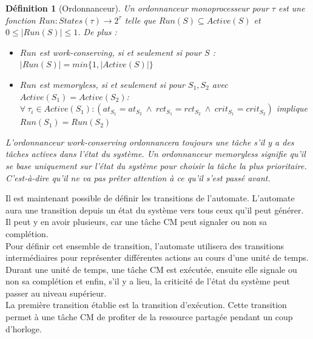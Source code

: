 \documentclass[12pt,a4paper,oneside]{book}
\theoremstyle{break}
\newtheorem{defin}{Définition}[chapter]
\theoremstyle{breakplain}
\begin{document}
\begin{defin}[Ordonnanceur]
Un \textit{ordonnanceur} monoprocesseur pour $\tau$ est une fonction $Run : States(\tau) \rightarrow 2^\tau$ telle que $Run(S) \subseteq Active(S)$ et $0 \leq |Run(S)| \leq 1$.
De plus :

\begin{itemize}
\item $Run$ est \textit{work-conserving}, si et seulement si pour $S$ : $ |Run(S)| = min\{1, |Active(S)|\}$
\item $Run$ est \textit{memoryless}, si et seulement si pour $S_1,S_2$ avec $Active(S_1) = Active(S_2)$:
$\forall\ \tau_i \in Active(S_1) : (at_{S_1} = at_{S_2}\ \wedge\ rct_{S_1} = rct_{S_2}\ \wedge\ crit_{S_1} = crit_{S_2} )$ implique $Run(S_1) = Run(S_2)$
\end{itemize}

L'ordonnanceur \textit{work-conserving} ordonnancera toujours une tâche s'il y a des tâches actives dans l'état du système. Un ordonnanceur \textit{memoryless} signifie qu'il se base uniquement sur l'état du système pour choisir la tâche la plus prioritaire. C'est-à-dire qu'il ne va pas prêter attention à ce qu'il s'est passé avant.

\end{defin}
Il est maintenant possible de définir les transitions de l'automate. L'automate aura une transition depuis un état du système vers tous ceux qu'il peut générer. Il peut y en avoir plusieurs, car une tâche CM peut signaler ou non sa complétion.\\

Pour définir cet ensemble de transition, l'automate utilisera des transitions intermédiaires pour représenter différentes actions au cours d'une unité de temps.\\

Durant une unité de temps, une tâche CM est exécutée, ensuite elle signale ou non sa complétion et enfin, s'il y a lieu, la criticité de l'état du système peut passer  au niveau supérieur.\\

La première transition établie est la transition d'exécution. Cette transition permet à une tâche CM de profiter de la ressource partagée pendant un coup d'horloge.\\
\end{document}
